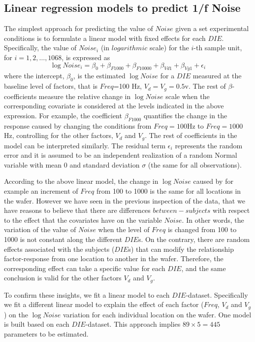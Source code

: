 \documentclass[sn-mathphys]{sn-jnl}%
\theoremstyle{thmstyleone}%
\theoremstyle{thmstyletwo}%
\theoremstyle{thmstylethree}%
\begin{document}
\subsection{Linear regression models to predict 1/f Noise}
\label{sec:linear_model}
\noindent The simplest approach for predicting the value of $Noise$ given a set experimental conditions is to formulate a linear model with fixed effects for each $DIE$. Specifically, the value of $Noise_i$ (in $logarithmic$ scale) for the $i$-th sample unit, for $i=1,2,\ldots, 1068$, is expressed as 
\begin{equation} \label{eq:lrmodel}
\log Noise_i  =\beta_0+\beta_{F1000}+\beta_{F10000} +\beta_{Vd1}+\beta_{Vg1}+\epsilon_i 
\end{equation}
where the intercept, $\beta_0$,  is the estimated $\log Noise$ for a $DIE$ measured at the baseline level of factors, that is $Freq$=100 Hz, $V_d=V_g=0.5$v. The rest of $\beta$-coefficients measure the relative change in $\log Noise$ scale when the corresponding covariate is considered at the levels indicated in the above expression.  For example, the coefficient $\beta_{F1000}$ quantifies the change in the response caused by changing the conditions from $Freq=100$Hz to $Freq=1000$Hz, controlling for the other factors, $V_d$ and $V_g$. The rest of coefficients in the model can be interpreted similarly.
The residual term $\epsilon_i$ represents the random error and it is assumed to be an independent realization of a random Normal variable  with mean 0 and standard deviation $\sigma$ (the same for all observations).

According to the above linear model, the change in $\log Noise$ caused by for example an increment of $Freq$ from 100 to 1000 is the same for all locations in the wafer. However we have seen in the previous inspection of the data, that we have reasons to believe that there are differences $between-subjects$ with respect to the effect that the covariates have on the variable $Noise$. In other words,  the variation of the value of $Noise$ when the level of $Freq$ is changed from 100 to 1000 is not constant along the different $DIE$s. On the contrary, there are random effects associated with the subjects ($DIE$s) that can modify the relationship factor-response from one location to another in the wafer. Therefore, the corresponding effect can take a specific value for each $DIE$, and the same conclusion is valid for the other factors $V_d$ and $V_g$.

To confirm these insights, we fit a linear model to each $DIE$-dataset. Specifically we fit a different linear model to explain the effect of each factor ($Freq$, $V_d$ and $V_g$) on the $\log Noise$ variation for each individual location on the wafer. One model  is built based on each $DIE$-dataset. This approach implies $89 \times 5=445$ parameters to be estimated. 
\end{document}
